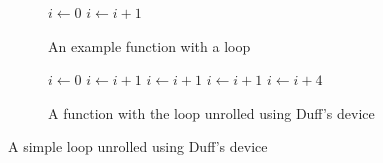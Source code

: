 \begin{figure}
    \begin{subfigure}[b]{0.5\textwidth}
        \centering
        \begin{algorithmic}
                \State $i \gets 0$
                    \State {}
                    \State $i \gets i + 1$
                \EndWhile
            \EndFunction
        \end{algorithmic}
        \caption{An example function with a loop}
    \end{subfigure}
    \begin{subfigure}[b]{0.5\textwidth}
        \centering
        \begin{algorithmic}
                \State $i \gets 0$
                        \State {}
                        \State $i \gets i + 1$ 
                    \EndCase
                        \State {}
                        \State $i \gets i + 1$ 
                    \EndCase
                        \State {}
                        \State $i \gets i + 1$
                    \EndCase
                \EndSwitch
                    \State {}
                    \State {}
                    \State {}
                    \State {}
                    \State $i \gets i + 4$
                \EndWhile
            \EndFunction
        \end{algorithmic}
        \caption{A function with the loop unrolled using Duff's device}
    \end{subfigure}
    \caption{A simple loop unrolled using Duff's device}
    \label{fig:basics:duff}
\end{figure}